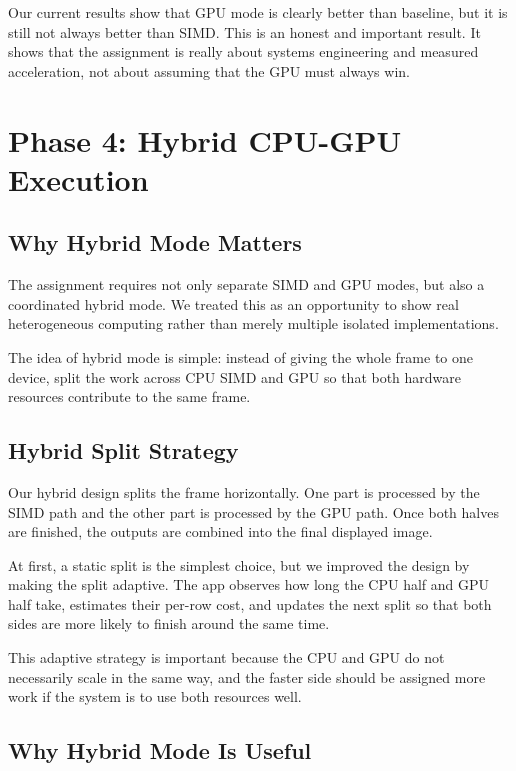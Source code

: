 \documentclass[12pt,a4paper]{article}
\begin{document}
Our current results show that GPU mode is clearly better than baseline, but it is still not always better than SIMD. This is an honest and important result. It shows that the assignment is really about systems engineering and measured acceleration, not about assuming that the GPU must always win.

\section{Phase 4: Hybrid CPU-GPU Execution}

\subsection{Why Hybrid Mode Matters}

The assignment requires not only separate SIMD and GPU modes, but also a coordinated hybrid mode. We treated this as an opportunity to show real heterogeneous computing rather than merely multiple isolated implementations.

The idea of hybrid mode is simple: instead of giving the whole frame to one device, split the work across CPU SIMD and GPU so that both hardware resources contribute to the same frame.

\subsection{Hybrid Split Strategy}

Our hybrid design splits the frame horizontally. One part is processed by the SIMD path and the other part is processed by the GPU path. Once both halves are finished, the outputs are combined into the final displayed image.

At first, a static split is the simplest choice, but we improved the design by making the split adaptive. The app observes how long the CPU half and GPU half take, estimates their per-row cost, and updates the next split so that both sides are more likely to finish around the same time.

This adaptive strategy is important because the CPU and GPU do not necessarily scale in the same way, and the faster side should be assigned more work if the system is to use both resources well.

\subsection{Why Hybrid Mode Is Useful}
\end{document}
